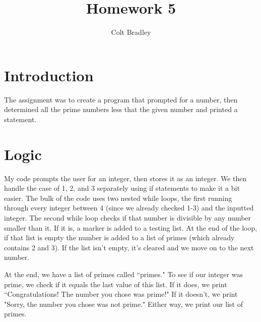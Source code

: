 \documentclass[11pt]{article}
\begin{document}
\title{Homework 5}
\author{Colt Bradley}
\date{}
\maketitle

\section{Introduction}
The assignment was to create a program that prompted for a number, then determined all the prime numbers less that the given number and printed a statement. 

\section{Logic}
My code prompts the user for an integer, then stores it as an integer. We then handle the case of 1, 2, and 3 separately using if statements to make it a bit easier. The bulk of the code uses two nested while loops, the first running through every integer between 4 (since we already checked 1-3) and the inputted integer. The second while loop checks if that number is divisible by any number smaller than it. If it is, a marker is added to a testing list. At the end of the loop, if that list is empty the number is added to a list of primes (which already contains 2 and 3). If the list isn't empty, it's cleared and we move on to the next number.

At the end, we have a list of primes called ``primes." To see if our integer was prime, we check if it equals the last value of this list. If it does, we print ``Congratulations! The number you chose was prime!" If it doesn't, we print "Sorry, the number you chose was not prime." Either way, we print our list of primes. 
\end{document}
